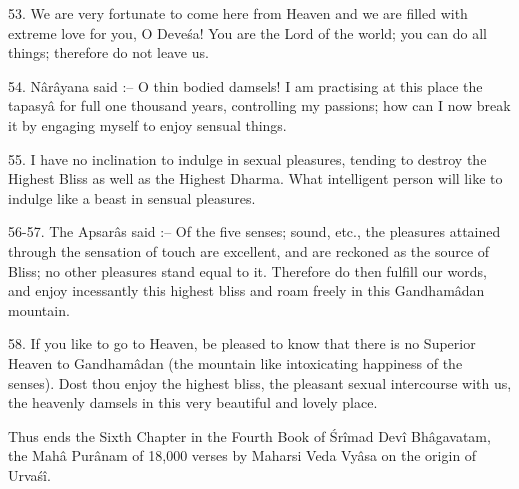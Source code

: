 53. We are very fortunate to come here from Heaven and we are filled with extreme love for you, O Deve\'sa! You are the Lord of the world; you can do all things; therefore do not leave us.

54. N\^ar\^ayana said :-- O thin bodied damsels! I am practising at this place the tapasy\^a for full one thousand years, controlling my passions; how can I now break it by engaging myself to enjoy sensual things.

55. I have no inclination to indulge in sexual pleasures, tending to destroy the Highest Bliss as well as the Highest Dharma. What intelligent person will like to indulge like a beast in sensual pleasures.

56-57. The Apsar\^as said :-- Of the five senses; sound, etc., the pleasures attained through the sensation of touch are excellent, and are reckoned as the source of Bliss; no other pleasures stand equal to it. Therefore do then fulfill our words, and enjoy incessantly this highest bliss and roam freely in this Gandham\^adan mountain.

58. If you like to go to Heaven, be pleased to know that there is no Superior Heaven to Gandham\^adan (the mountain like intoxicating happiness of the senses). Dost thou enjoy the highest bliss, the pleasant sexual intercourse with us, the heavenly damsels in this very beautiful and lovely place.

Thus ends the Sixth Chapter in the Fourth Book of \'Sr\^imad Dev\^i Bh\^agavatam, the Mah\^a Pur\^anam of 18,000 verses by Maharsi Veda Vy\^asa on the origin of Urva\'s\^i.